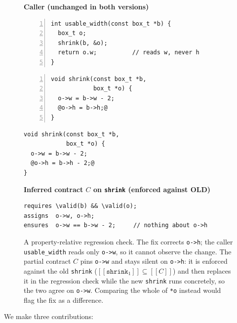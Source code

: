 \documentclass[conference]{IEEEtran}
\theoremstyle{definition}
\theoremstyle{remark}
\newcommand{\sem}[1]{[\![#1]\!]}
\begin{document}
\begin{figure}[t]
  \centering
  {\footnotesize\textbf{Caller (unchanged in both versions)}}
\begin{lstlisting}[style=cdiff,numbers=left,numberstyle=\tiny\color{gray},numbersep=4pt]
int usable_width(const box_t *b) {
  box_t o;
  shrink(b, &o);
  return o.w;          // reads w, never h
}
\end{lstlisting}
  \begin{minipage}[t]{0.49\linewidth}
\begin{lstlisting}[style=cdiff,numbers=left,numberstyle=\tiny\color{gray},numbersep=4pt,
  moredelim={[is][\color{red!70!black}\bfseries]{@}{@}}]
void shrink(const box_t *b,
            box_t *o) {
  o->w = b->w - 2;
  @o->h = b->h;@
}
\end{lstlisting}
  \end{minipage}\hfill
  \begin{minipage}[t]{0.49\linewidth}
\begin{lstlisting}[style=cdiff,moredelim={[is][\color{green!50!black}\bfseries]{@}{@}}]
void shrink(const box_t *b,
            box_t *o) {
  o->w = b->w - 2;
  @o->h = b->h - 2;@
}
\end{lstlisting}
  \end{minipage}

  {\footnotesize\textbf{Inferred contract $C$ on \texttt{shrink}
  (enforced against OLD)}}
\begin{lstlisting}[style=cdiff]
requires \valid(b) && \valid(o);
assigns  o->w, o->h;
ensures  o->w == b->w - 2;     // nothing about o->h
\end{lstlisting}
  \caption{A property-relative regression check. The fix corrects
    \texttt{o->h}; the caller \texttt{usable\_width} reads only
    \texttt{o->w}, so it cannot observe the change. The partial contract
    $C$ pins \texttt{o->w} and stays silent on \texttt{o->h}: it is
    enforced against the old \texttt{shrink}
    ($\sem{\mathtt{shrink}_1}\subseteq\sem{C}$) and then replaces it in
    the regression check while the new \texttt{shrink} runs concretely,
    so the two agree on \texttt{o->w}. Comparing the whole of
  \texttt{*o} instead would flag the fix as a difference.}
  \label{fig:motivating}
\end{figure}

We make three contributions:
\end{document}
